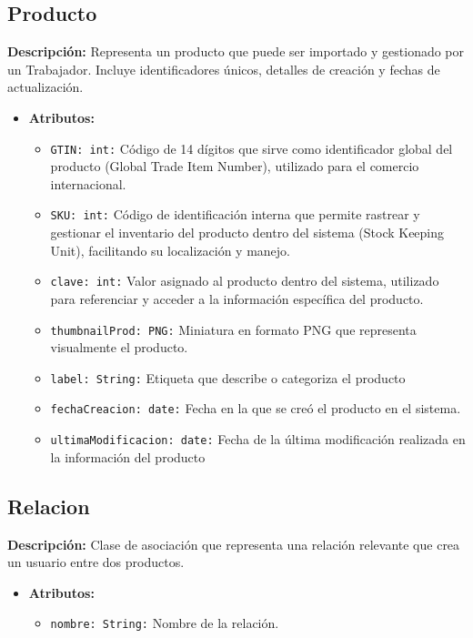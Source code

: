 \documentclass[12pt.a4paper]{article}
\begin{document}
\subsection{Producto}
\textbf{Descripción:} Representa un producto que puede ser importado y gestionado por un Trabajador. Incluye identificadores únicos, detalles de creación y fechas de actualización.
    \begin{itemize}
        \item {\textbf{Atributos:}}
        \begin{itemize}
            \item \texttt{GTIN: int:} Código de 14 dígitos que sirve como identificador global del producto (Global Trade Item Number), utilizado para el comercio internacional.
            \item \texttt{SKU: int:} Código de identificación interna que permite rastrear y gestionar el inventario del producto dentro del sistema (Stock Keeping Unit), facilitando su localización y manejo.
            \item \texttt{clave: int:} Valor asignado al producto dentro del sistema, utilizado para referenciar y acceder a la información específica del producto.
            \item \texttt{thumbnailProd: PNG:} Miniatura en formato PNG que representa visualmente el producto.
            \item \texttt{label: String:} Etiqueta que describe o categoriza el producto
            \item \texttt{fechaCreacion: date:} Fecha en la que se creó el producto en el sistema.
            \item \texttt{ultimaModificacion: date:} Fecha de la última modificación realizada en la información del producto
        \end{itemize}
    \end{itemize}

\subsection{Relacion}
\textbf{Descripción:} Clase de asociación que representa una relación relevante que crea un usuario entre dos productos.
    \begin{itemize}
        \item {\textbf{Atributos:}}
        \begin{itemize}
            \item \texttt{nombre: String:} Nombre de la relación.
        \end{itemize}
    \end{itemize}
\end{document}
